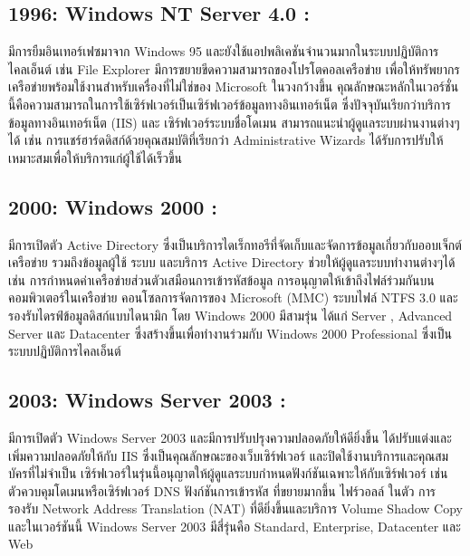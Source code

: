 \hspace{0cm}\subsection{1996: Windows NT Server 4.0 :}มีการยืมอินเทอร์เฟซมาจาก Windows 95 และยังใช้แอปพลิเคชันจำนวนมากในระบบปฏิบัติการไคลเอ็นต์ เช่น File Explorer มีการขยายขีดความสามารถของโปรโตคอลเครือข่าย เพื่อให้ทรัพยากรเครือข่ายพร้อมใช้งานสำหรับเครื่องที่ไม่ใช่ของ Microsoft ในวงกว้างขึ้น คุณลักษณะหลักในเวอร์ชั่นนี้คือความสามารถในการใช้เซิร์ฟเวอร์เป็นเซิร์ฟเวอร์ข้อมูลทางอินเทอร์เน็ต ซึ่งปัจจุบันเรียกว่าบริการข้อมูลทางอินเทอร์เน็ต (IIS) และ เซิร์ฟเวอร์ระบบชื่อโดเมน สามารถแนะนำผู้ดูแลระบบผ่านงานต่างๆได้ เช่น การแชร์ฮาร์ดดิสก์ด้วยคุณสมบัติที่เรียกว่า Administrative Wizards ได้รับการปรับให้เหมาะสมเพื่อให้บริการแก่ผู้ใช้ได้เร็วขึ้น

\hspace{0cm}\subsection{2000: Windows 2000 :}มีการเปิดตัว Active Directory ซึ่งเป็นบริการไดเร็กทอรีที่จัดเก็บและจัดการข้อมูลเกี่ยวกับออบเจ็กต์เครือข่าย รวมถึงข้อมูลผู้ใช้ ระบบ และบริการ Active Directory ช่วยให้ผู้ดูแลระบบทำงานต่างๆได้ เช่น การกำหนดค่าเครือข่ายส่วนตัวเสมือนการเข้ารหัสข้อมูล การอนุญาตให้เข้าถึงไฟล์ร่วมกันบนคอมพิวเตอร์ในเครือข่าย คอนโซลการจัดการของ Microsoft (MMC) ระบบไฟล์ NTFS 3.0 และ รองรับไดรฟ์ข้อมูลดิสก์แบบไดนามิก โดย Windows 2000 มีสามรุ่น ได้แก่ Server , Advanced Server และ Datacenter ซึ่งสร้างขึ้นเพื่อทำงานร่วมกับ Windows 2000 Professional ซึ่งเป็นระบบปฏิบัติการไคลเอ็นต์  

\hspace{0cm}\subsection{2003: Windows Server 2003 :}มีการเปิดตัว Windows Server 2003 และมีการปรับปรุงความปลอดภัยให้ดียิ่งขึ้น ได้ปรับแต่งและเพิ่มความปลอดภัยให้กับ IIS ซึ่งเป็นคุณลักษณะของเว็บเซิร์ฟเวอร์ และปิดใช้งานบริการและคุณสมบัครที่ไม่จำเป็น เซิร์ฟเวอร์ในรุ่นนี้อนุญาตให้ผู้ดูแลระบบกำหนดฟังก์ชันเฉพาะให้กับเซิร์ฟเวอร์ เช่น ตัวควบคุมโดเมนหรือเซิร์ฟเวอร์ DNS   ฟังก์ชันการเข้ารหัส ที่ขยายมากขึ้น ไฟร์วอลล์  ในตัว  การรองรับ Network Address Translation (NAT) ที่ดียิ่งขึ้นและบริการ Volume Shadow Copy และในเวอร์ชันนี้ Windows Server 2003 มีสี่รุ่นคือ Standard, Enterprise, Datacenter และ Web 

